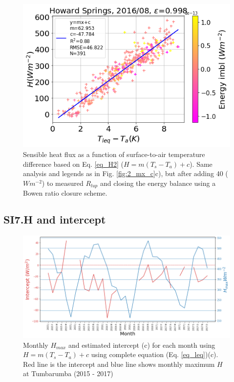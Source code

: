 \documentclass[fleqn,10pt]{wlscirep}
\begin{document}
{  \begin{figure}[h!]
	\includegraphics[scale=0.35]{rlup_br_hs.png}
	\centering
    \caption{Sensible heat flux as a function of surface-to-air temperature difference based on Eq. \ref{eq_H2} ($H = m (T_{s} - T_{a}) + c$). Same analysis and legends as in Fig. \ref{fig:2_mx_c}c), but after adding 40 ($W m^{-2}$) to measured $R_{lup}$ and closing the energy balance using a Bowen ratio closure scheme.}
	\label{fig:Rlup_ebc}
\end{figure}

\subsection*{SI7.H and intercept}
\label{Subsection:intercept}
\begin{figure}[h!]
  \includegraphics[scale=0.5]{Plots/TUm_hmx_intrc}
  \caption{Monthly $H_{max}$ and estimated intercept (c) for each month using $H = m (T_{s} - T_{a})+ c$ using complete equation (Eq. \ref{eq_leq})(c). Red line is the intercept and blue line shows monthly maximum $H$ at Tumbarumba (2015 - 2017)}
  \label{fig:yr_intrc}
  \end{figure}
  
}
\end{document}
